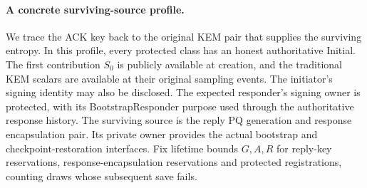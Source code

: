 \paragraph{A concrete surviving-source profile.}
We trace the ACK key back to the original KEM pair that supplies the
surviving entropy. In this profile, every protected class has an
honest authoritative Initial. The first contribution $S_0$ is publicly available
at creation, and the traditional KEM scalars are available at their
original sampling events. The initiator's signing identity may also be
disclosed. The expected responder's signing owner is protected, with its
BootstrapResponder purpose used through the authoritative response
history. The surviving source is the reply PQ generation and response
encapsulation pair. Its private owner provides the actual bootstrap and
checkpoint-restoration interfaces. Fix lifetime bounds $G,A,R$ for
reply-key reservations, response-encapsulation reservations and protected
registrations, counting draws whose subsequent save fails.

